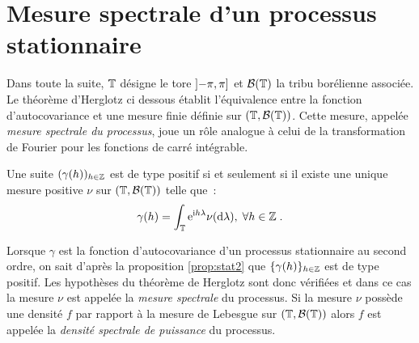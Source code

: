 \section{Mesure spectrale d'un processus stationnaire}
Dans toute la suite, $\mathbb{T}$ d\'esigne le tore $\left]-\pi,\pi\right]$ et
$\mathcal{B}(\mathbb{T})$ la tribu bor\'elienne associ\'ee. Le th\'eor\`eme
d'Herglotz ci dessous \'etablit l'\'equivalence entre la fonction
d'autocovariance et une mesure finie d\'efinie sur
$(\mathbb{T},\mathcal{B}(\mathbb{T}))$. Cette mesure, appel\'ee \emph{mesure
  spectrale du processus}, joue un r\^ole analogue \`a celui de la transformation
de Fourier pour les fonctions de carr\'e int\'egrable.
\begin{theorem}[Herglotz]
\label{theo:herglotz}
 Une suite $(\gamma(h))_{h \in
\mathbb{Z}}$ est de type positif si et seulement si il existe une unique
mesure positive $\nu$ sur $(\mathbb{T},\mathcal{B}(\mathbb{T}))$ telle que~:
\begin{eqnarray}
\label{eq:herglotz}
 \gamma(h) = \int_{\mathbb{T}} \mathrm{e}^{\mathrm{i} h\lambda} \nu(\mathrm{d}\lambda),\; \forall h\in\mathbb{Z}\;.
\end{eqnarray}
\end{theorem}
Lorsque $\gamma$ est la fonction d'autocovariance d'un processus
stationnaire au second ordre, on sait d'apr\`es la proposition
\ref{prop:stat2} que $\{\gamma(h)\}_{h \in
\mathbb{Z}}$ est de type positif. Les hypoth\`eses du th\'eor\`eme de Herglotz
sont donc v\'erifi\'ees et dans ce cas
la mesure $\nu$ est appel\'ee la
\emph{mesure spectrale} du processus.
Si la mesure $\nu$ poss\`ede une densit\'e $f$  par rapport \`a la mesure de Lebesgue sur
 $(\mathbb{T},\mathcal{B}(\mathbb{T}))$ alors  $f$  est
appel\'ee la \emph{densit\'e spectrale de puissance}
du processus.

